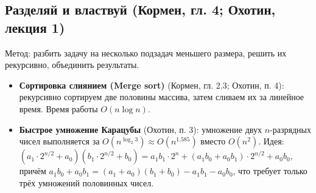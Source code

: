 \documentclass[a4paper,12pt]{article}
\begin{document}
\subsection{Разделяй и властвуй (Кормен, гл. 4; Охотин, лекция 1)}
Метод: разбить задачу на несколько подзадач меньшего размера, решить их рекурсивно, объединить результаты.
\begin{itemize}
    \item \textbf{Сортировка слиянием (Merge sort)} (Кормен, гл. 2.3; Охотин, п. 4): рекурсивно сортируем две половины массива, затем сливаем их за линейное время. Время работы \( O(n\log n) \).
    \item \textbf{Быстрое умножение Карацубы} (Охотин, п. 3): умножение двух \( n \)-разрядных чисел выполняется за \( O(n^{\log_2 3}) \approx O(n^{1.585}) \) вместо \( O(n^2) \). Идея: \( (a_1\cdot2^{n/2}+a_0)(b_1\cdot2^{n/2}+b_0)=a_1b_1\cdot2^n+(a_1b_0+a_0b_1)\cdot2^{n/2}+a_0b_0 \), причём \( a_1b_0+a_0b_1 = (a_1+a_0)(b_1+b_0)-a_1b_1-a_0b_0 \), что требует только трёх умножений половинных чисел.
\end{itemize}
\end{document}
